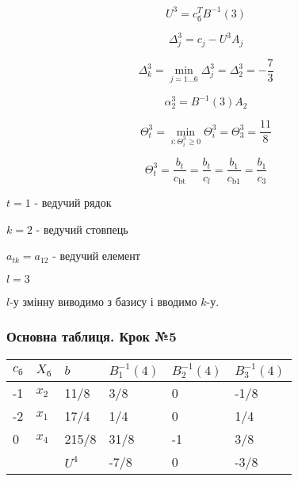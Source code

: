 \documentclass[a4paper, 12pt]{article}
\begin{document}
\begin{equation*}
	U^{3} = c_{\text{б}}^TB^{-1}(3)
\end{equation*}

\begin{equation*}
	\Delta_{j}^{3} = c_j - U^{3}A_{j}
\end{equation*}

\begin{equation*}
	\Delta_k^{3} = \min_{j=1 \dots 6} \Delta_j^{3} = \Delta_2^{3} = -\frac{7}{3}
\end{equation*}

\begin{equation*}
	\alpha_{2}^{3} = B^{-1}(3)A_{2}
\end{equation*}

\begin{equation*}
	\Theta_t^{3} = \min_{i: \Theta_i^{3} \geqslant 0} \Theta_i^{3} = \Theta_3^{3} = \frac{11}{8}
\end{equation*}

\begin{equation*}
	\Theta_t^{3} = \frac{b_t}{c_\text{bt}} = \frac{b_t}{c_l} = \frac{b_1}{c_\text{b1}} = \frac{b_1}{c_\text{3}}
\end{equation*}

$t = 1$ - ведучий рядок

$k = 2$ - ведучий стовпець

$a_{tk} = a_{12}$ - ведучий елемент

$l = 3$

$l$-у змінну виводимо з базису і вводимо $k$-у.

\subsubsection{Основна таблиця. Крок №5}

\begin{table}[H]
    \centering
    \begin{tabular}{|l|l|l|l|l|l|}
    \hline
         $c_\text{б}$ & $X_\text{б}$ & $b$ & $B_{1}^{-1}(4)$ & $B_{2}^{-1}(4)$ & $B_{3}^{-1}(4)$ \\ \hline
        -1 & $x_2$ & 11/8 & 3/8 & 0 & -1/8 \\ \hline
        -2 & $x_1$ & 17/4 & 1/4 & 0 & 1/4 \\ \hline
        0 & $x_4$ & 215/8 & 31/8 & -1 & 3/8 \\ \hline
        & & $U^{4}$ & -7/8 & 0 & -3/8 \\ \hline
    \end{tabular}
\end{table}
\end{document}
